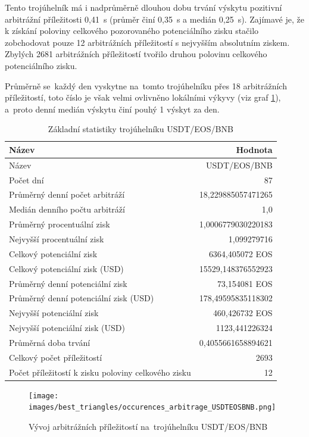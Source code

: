 \documentclass[thesis=B,czech]{FITthesis}[2019/03/21]
\begin{document}
Tento trojúhelník má i nadprůměrně dlouhou dobu trvání výskytu pozitivní arbitrážní příležitosti 0,41~s (průměr činí 0,35~s a medián 0,25~s). Zajímavé je, že k získání poloviny celkového pozorovaného potenciálního zisku stačilo zobchodovat pouze 12 arbitrážních příležitostí s nejvyšším absolutním ziskem. Zbylých 2681 arbitrážních příležitostí tvořilo druhou polovinu celkového potenciálního zisku.

Průměrně se~každý den vyskytne na~tomto trojúhelníku přes 18 arbitrážních příležitostí, toto číslo je však velmi ovlivněno lokálními výkyvy (viz graf \ref{occurences_arbitrage_USDTEOSBN}), a~proto denní medián výskytu činí pouhý 1 výskyt za den.

\begin{table}\centering
\caption{Základní statistiky trojúhelníku USDT/EOS/BNB}
\label{USDTEOSBNB_stats}
\begin{tabular}{|| l | r ||}
\hline Název & Hodnota \\ 
\hline\hline Název & USDT/EOS/BNB \\ 
\hline Počet dní & 87 \\ 
\hline Průměrný denní počet arbitráží & 18,229885057471265 \\ 
\hline Medián denního počtu arbitráží & 1,0 \\ 
\hline Průměrný procentuální zisk & 1,0006779030220183 \\ 
\hline Nejvyšší procentuální zisk & 1,099279716 \\ 
\hline Celkový potenciální zisk & 6364,405072 EOS \\ 
\hline Celkový potenciální zisk (USD) & 15529,148376552923 \\ 
\hline Průměrný denní potenciální zisk & 73,154081 EOS \\ 
\hline Průměrný denní potenciální zisk (USD) & 178,49595835118302 \\ 
\hline Nejvyšší potenciální zisk & 460,426732 EOS \\ 
\hline Nejvyšší potenciální zisk (USD) & 1123,441226324 \\ 
\hline Průměrná doba trvání & 0,4055661658894621 \\ 
\hline Celkový počet příležitostí & 2693 \\ 
\hline Počet příležitostí k zisku poloviny celkového zisku & 12 \\ 
\hline
\end{tabular}
\end{table}

\begin{figure}\centering
	\texttt{[image: images/best\_triangles/occurences\_arbitrage\_USDTEOSBNB.png]}
	\caption{Vývoj arbitrážních příležitostí na~trojúhelníku USDT/EOS/BNB }\label{occurences_arbitrage_USDTEOSBN}
\end{figure}
\end{document}

